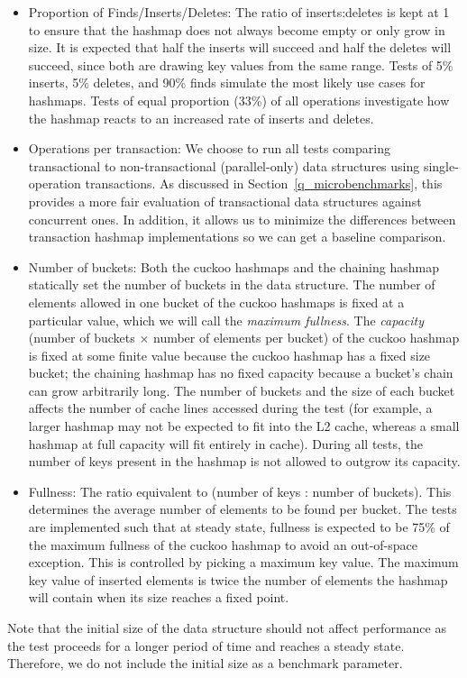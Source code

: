 \begin{itemize}
    \item Proportion of Finds/Inserts/Deletes: The ratio of inserts:deletes is kept at 1 to ensure that the hashmap does not always become empty or only grow in size. It is expected that half the inserts will succeed and half the deletes will succeed, since both are drawing key values from the same range. Tests of 5\% inserts, 5\% deletes, and 90\% finds simulate the most likely use cases for hashmaps\cite{hm1}. Tests of equal proportion (33\%) of all operations investigate how the hashmap reacts to an increased rate of inserts and deletes.
    \item Operations per transaction: We choose to run all tests comparing transactional to non-transactional (parallel-only) data structures using single-operation transactions. As discussed in Section~\ref{q_microbenchmarks}, this provides a more fair evaluation of transactional data structures against concurrent ones. In addition, it allows us to minimize the differences between transaction hashmap implementations so we can get a baseline comparison.
    \item Number of buckets: Both the cuckoo hashmaps and the chaining hashmap statically set the number of buckets in the data structure. The number of elements allowed in one bucket of the cuckoo hashmaps is fixed at a particular value, which we will call the \emph{maximum fullness}. 
        The \emph{capacity} (number of buckets $\times$ number of elements per bucket) of the cuckoo hashmap is fixed at some finite value because the cuckoo hashmap has a fixed size bucket; the chaining hashmap has no fixed capacity because a bucket's chain can grow arbitrarily long.
        The number of buckets and the size of each bucket affects the number of cache lines accessed during the test (for example, a larger hashmap may not be expected to fit into the L2 cache, whereas a small hashmap at full capacity will fit entirely in cache). During all tests, the number of keys present in the hashmap is not allowed to outgrow its capacity.
    \item Fullness: The ratio equivalent to (number of keys : number of buckets). This determines the average number of elements to be found per bucket. The tests are implemented such that at steady state, fullness is expected to be 75\% of the maximum fullness of the cuckoo hashmap to avoid an out-of-space exception. This is controlled by picking a maximum key value. The maximum key value of inserted elements is twice the number of elements the hashmap will contain when its size reaches a fixed point.
\end{itemize}
Note that the initial size of the data structure should not affect performance as the test proceeds for a longer period of time and reaches a steady state. Therefore, we do not include the initial size as a benchmark parameter.

